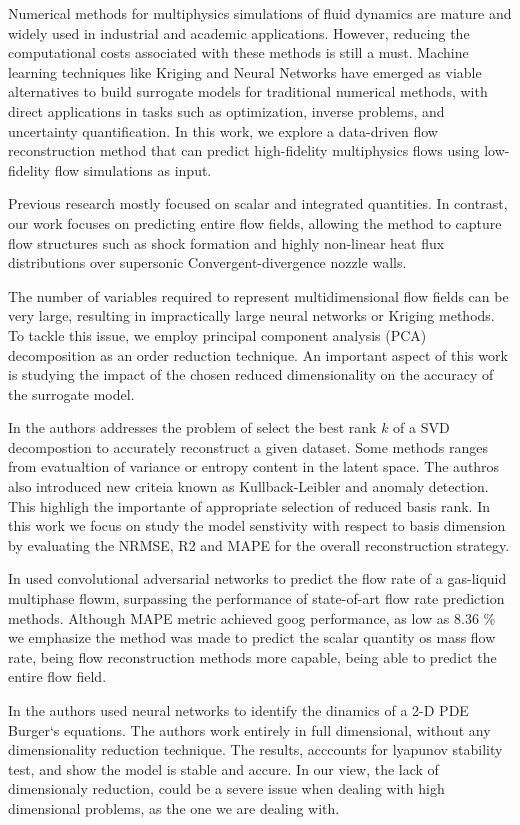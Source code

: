 Numerical methods for multiphysics simulations of fluid dynamics are mature and widely used in industrial and academic applications. However, reducing the computational costs associated with these methods is still a must. Machine learning techniques like Kriging and Neural Networks have emerged as viable alternatives to build surrogate models for traditional numerical methods, with direct applications in tasks such as optimization, inverse problems, and uncertainty quantification. In this work, we explore a data-driven flow reconstruction method that can predict high-fidelity multiphysics flows using low-fidelity flow simulations as input.

Previous research mostly focused on scalar and integrated quantities. In contrast, our work focuses on predicting entire flow fields, allowing the method to capture flow structures such as shock formation and highly non-linear heat flux distributions over supersonic Convergent-divergence nozzle walls.

The number of variables required to represent multidimensional flow fields can be very large, resulting in impractically large neural networks or Kriging methods. To tackle this issue, we employ principal component analysis (PCA) decomposition as an order reduction technique. An important aspect of this work is studying the impact of the chosen reduced dimensionality on the accuracy of the surrogate model.

In \cite{faliniReview2022} the authors addresses the problem of select the best rank $k$ of a SVD decompostion to accurately reconstruct a given dataset. Some methods ranges from evatualtion of variance or entropy content in the latent space. The authros also introduced new criteia known as Kullback-Leibler and anomaly detection. This highligh the importante of appropriate selection of reduced basis rank. In this work we focus on study the model senstivity with respect to basis dimension by evaluating the NRMSE, R2 and MAPE for the overall reconstruction strategy. 

In \cite{huFlow2020} used convolutional adversarial networks  to predict the flow rate of a gas-liquid multiphase flowm, surpassing the performance of state-of-art flow rate prediction methods. Although MAPE metric achieved goog performance, as low as 8.36 \% we emphasize the method was made to predict the scalar quantity os mass flow rate, being flow reconstruction methods more capable, being able to predict the entire flow field. 

In \cite{Boundary2018} the authors used neural networks to identify the dinamics of a 2-D PDE Burger`s equations. The authors work entirely in full dimensional, without any dimensionality reduction technique. The results, acccounts for lyapunov stability test, and show the model is stable and accure. In our view, the lack of dimensionaly reduction, could be a severe issue when dealing with high dimensional problems, as the one we are dealing with.

